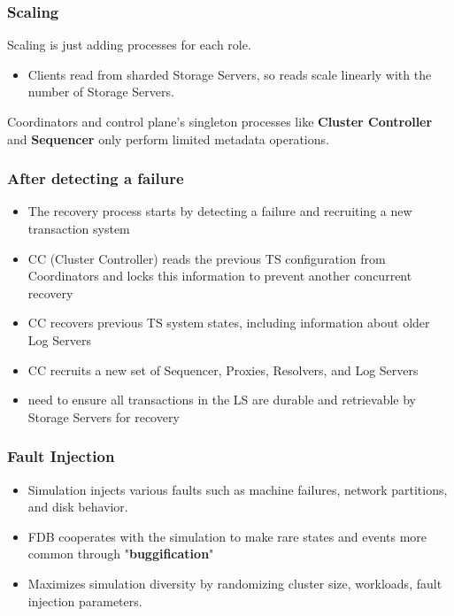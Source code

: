 \begin{frame}
	\frametitle{Scaling}
Scaling is just adding processes for each role. \\

\begin{itemize}
\item Clients read from sharded Storage Servers, so reads scale
linearly with the number of Storage Servers. 
\end{itemize}

\vspace{0.5cm}
Coordinators and control plane's singleton processes like \textbf{Cluster Controller} and \textbf{Sequencer} only perform limited metadata operations.
	
\end{frame}


\begin{frame}
	\frametitle{After detecting a failure}
    \begin{itemize}
        \item The recovery process starts by
        detecting a failure and recruiting a new transaction system
        \item CC (Cluster Controller) reads the previous TS configuration from Coordinators and locks this information
        to prevent another concurrent recovery
        \item CC recovers previous TS system states, including information about older Log Servers
        \item CC recruits a new set of Sequencer, Proxies, Resolvers,
        and Log Servers
        \item need to ensure all transactions in the LS are durable and retrievable by Storage Servers for recovery

    \end{itemize}

\end{frame}


\begin{frame}
    \frametitle{Fault Injection}
    \begin{itemize}
        \item Simulation injects various faults such as machine failures, network partitions, and disk behavior.
        \item FDB cooperates with the simulation to make rare states and events more common through "\textbf{buggification}"
        \item Maximizes simulation diversity by randomizing cluster size, workloads, fault injection parameters.
    \end{itemize}
\end{frame} 